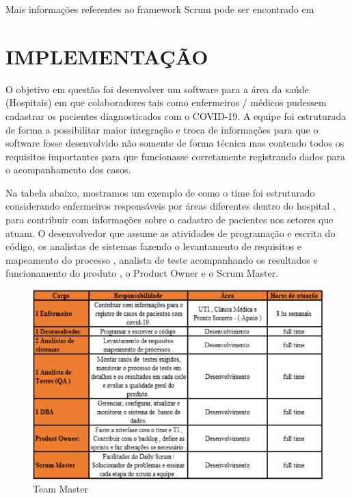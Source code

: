 \documentclass[
	12pt,				%
	oneside,			%
	a4paper,			%
  section=TITLE,
	brazil,				%
	]{abntex2}
\begin{document}
Mais informações referentes ao framework Scrum pode ser encontrado em
\cite{scrum-guide}

\section{IMPLEMENTAÇÃO}

O objetivo em questão foi desenvolver um software para a área da saúde
(Hospitais) em que colaboradores tais como enfermeiros / médicos pudessem
cadastrar os pacientes diagnosticados com o COVID-19. A equipe foi estruturada
de forma a possibilitar maior integração e troca de informações para que o
software fosse desenvolvido não somente de forma técnica mas contendo todos os
requisitos importantes para que funcionasse corretamente registrando dados para
o acompanhamento dos casos.

Na tabela abaixo, mostramos um exemplo de como o time foi estruturado
considerando enfermeiros responsáveis por áreas diferentes dentro do hospital ,
para contribuir com informações sobre o cadastro de pacientes nos setores que
atuam. O desenvolvedor que assume as atividades de programação e escrita do
código, os analistas de sistemas fazendo o levantamento de requisitos e
mapeamento do processo , analista de teste acompanhando os resultados e
funcionamento do produto , o Product Owner e o Scrum Master.


\begin{figure}[htb]
\caption{\label{fig_Team_Master}Team Master}
\begin{center}
\includegraphics[scale=2.60]{img/team-master.png}
\end{center}
\end{figure}
\end{document}
